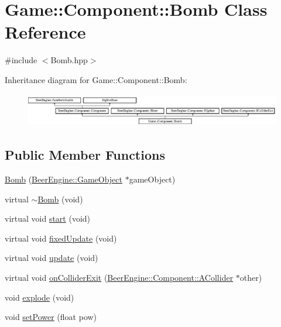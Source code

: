\hypertarget{class_game_1_1_component_1_1_bomb}{}\section{Game\+:\+:Component\+:\+:Bomb Class Reference}
\label{class_game_1_1_component_1_1_bomb}


{\ttfamily \#include $<$Bomb.\+hpp$>$}

Inheritance diagram for Game\+:\+:Component\+:\+:Bomb\+:\begin{figure}[H]
\begin{center}
\leavevmode
\includegraphics[height=1.473684cm]{class_game_1_1_component_1_1_bomb}
\end{center}
\end{figure}
\subsection*{Public Member Functions}
\begin{DoxyCompactItemize}
\item 
\mbox{\hyperlink{class_game_1_1_component_1_1_bomb_aed38ca47ddf849382948b02485be41f8}{Bomb}} (\mbox{\hyperlink{class_beer_engine_1_1_game_object}{Beer\+Engine\+::\+Game\+Object}} $\ast$game\+Object)
\item 
virtual \mbox{\hyperlink{class_game_1_1_component_1_1_bomb_a08d967ddfb90d063b71270ce6d087c2f}{$\sim$\+Bomb}} (void)
\item 
virtual void \mbox{\hyperlink{class_game_1_1_component_1_1_bomb_a74e5f8e628a9d434f0faf91273f33990}{start}} (void)
\item 
virtual void \mbox{\hyperlink{class_game_1_1_component_1_1_bomb_af6598c095c2f36a2a1b1048eb84d6fc7}{fixed\+Update}} (void)
\item 
virtual void \mbox{\hyperlink{class_game_1_1_component_1_1_bomb_a6685384996c92b8d3f0955c2f6a335b5}{update}} (void)
\item 
virtual void \mbox{\hyperlink{class_game_1_1_component_1_1_bomb_a73e1089e8b6be42c0357beda3ab6ccfa}{on\+Collider\+Exit}} (\mbox{\hyperlink{class_beer_engine_1_1_component_1_1_a_collider}{Beer\+Engine\+::\+Component\+::\+A\+Collider}} $\ast$other)
\item 
void \mbox{\hyperlink{class_game_1_1_component_1_1_bomb_aac712a604337a08ce89f88782cae5df9}{explode}} (void)
\item 
void \mbox{\hyperlink{class_game_1_1_component_1_1_bomb_a3432430350d557ef1b7d9ac0339b659a}{set\+Power}} (float pow)
\end{DoxyCompactItemize}
